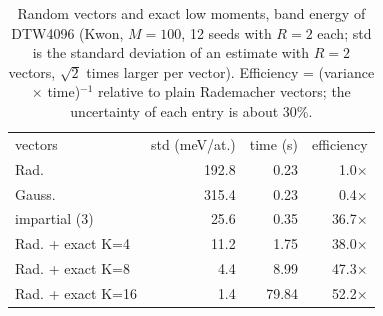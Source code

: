 \begin{table}[t]\caption{Random vectors and exact low moments, band energy of DTW4096 (Kwon, $M=100$, 12 seeds with $R=2$ each; std is the standard deviation of an estimate with $R=2$ vectors, $\sqrt2$ times larger per vector). Efficiency = (variance $\times$ time)$^{-1}$ relative to plain Rademacher vectors; the uncertainty of each entry is about 30\%.}\label{tab:vec}\begin{ruledtabular}\begin{tabular}{lrrr}
vectors & std (meV/at.) & time (s) & efficiency \\ \colrule
Rad. & 192.8 & 0.23 & 1.0$\times$ \\
Gauss. & 315.4 & 0.23 & 0.4$\times$ \\
impartial (3) & 25.6 & 0.35 & 36.7$\times$ \\
Rad. + exact K=4 & 11.2 & 1.75 & 38.0$\times$ \\
Rad. + exact K=8 & 4.4 & 8.99 & 47.3$\times$ \\
Rad. + exact K=16 & 1.4 & 79.84 & 52.2$\times$ \\
\end{tabular}\end{ruledtabular}\end{table}
